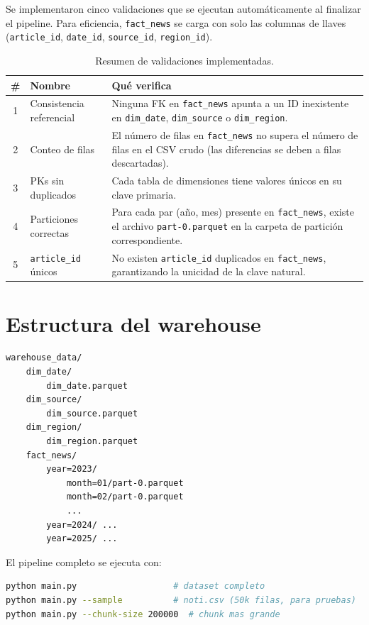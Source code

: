 \documentclass[11pt, letterpaper]{article}
\begin{document}
Se implementaron cinco validaciones que se ejecutan automáticamente al
finalizar el pipeline. Para eficiencia, \texttt{fact\_news} se carga con
solo las columnas de llaves (\texttt{article\_id}, \texttt{date\_id},
\texttt{source\_id}, \texttt{region\_id}).

\begin{table}[H]
\centering
\begin{tabular}{clp{8cm}}
\toprule
\textbf{\#} & \textbf{Nombre} & \textbf{Qué verifica} \\
\midrule
1 & Consistencia referencial &
  Ninguna FK en \texttt{fact\_news} apunta a un ID inexistente en
  \texttt{dim\_date}, \texttt{dim\_source} o \texttt{dim\_region}. \\
2 & Conteo de filas &
  El número de filas en \texttt{fact\_news} no supera el número de filas
  en el CSV crudo (las diferencias se deben a filas descartadas). \\
3 & PKs sin duplicados &
  Cada tabla de dimensiones tiene valores únicos en su clave primaria. \\
4 & Particiones correctas &
  Para cada par (año, mes) presente en \texttt{fact\_news}, existe el
  archivo \texttt{part-0.parquet} en la carpeta de partición correspondiente. \\
5 & \texttt{article\_id} únicos &
  No existen \texttt{article\_id} duplicados en \texttt{fact\_news},
  garantizando la unicidad de la clave natural. \\
\bottomrule
\end{tabular}
\caption{Resumen de validaciones implementadas.}
\end{table}

\section{Estructura del warehouse}

\begin{lstlisting}
warehouse_data/
    dim_date/
        dim_date.parquet
    dim_source/
        dim_source.parquet
    dim_region/
        dim_region.parquet
    fact_news/
        year=2023/
            month=01/part-0.parquet
            month=02/part-0.parquet
            ...
        year=2024/ ...
        year=2025/ ...
\end{lstlisting}

El pipeline completo se ejecuta con:
\begin{lstlisting}[language=bash]
python main.py                   # dataset completo
python main.py --sample          # noti.csv (50k filas, para pruebas)
python main.py --chunk-size 200000  # chunk mas grande
\end{lstlisting}
\end{document}
